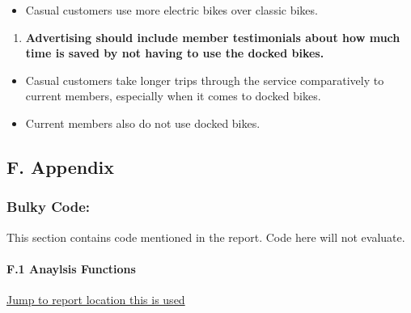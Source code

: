 \documentclass[
]{article}
\providecommand{\tightlist}{%
  \setlength{\itemsep}{0pt}\setlength{\parskip}{0pt}}
\begin{document}
\begin{itemize}
\tightlist
\item
  Casual customers use more electric bikes over classic bikes.
\end{itemize}

\begin{enumerate}
\def\labelenumi{\arabic{enumi}.}
\setcounter{enumi}{2}
\tightlist
\item
  \textbf{Advertising should include member testimonials about how much
  time is saved by not having to use the docked bikes.}
\end{enumerate}

\begin{itemize}
\tightlist
\item
  Casual customers take longer trips through the service comparatively
  to current members, especially when it comes to docked bikes.
\item
  Current members also do not use docked bikes.
\end{itemize}

\hypertarget{f.-appendix}{%
\subsection{F. Appendix}\label{f.-appendix}}

\hypertarget{bulky-code}{%
\subsubsection{Bulky Code:}\label{bulky-code}}

This section contains code mentioned in the report. Code here will not
evaluate.

\hypertarget{f.1-anaylsis-functions}{%
\paragraph{F.1 Anaylsis Functions}\label{f.1-anaylsis-functions}}

\protect\hyperlink{Ref1}{Jump to report location this is used}
\end{document}

